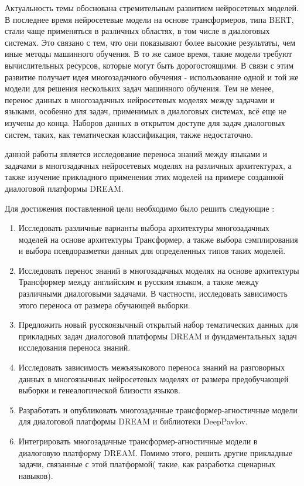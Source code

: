 
{\actuality} 
Актуальность темы обоснована стремительным развитием нейросетевых моделей. В последнее время нейросетевые модели на основе трансформеров, типа BERT, стали чаще применяться в различных областях, в том числе в диалоговых системах. Это связано с тем, что они показывают более высокие результаты, чем иные методы машинного обучения. В то же самое время, такие модели требуют вычислительных ресурсов, которые могут быть дорогостоящими. В связи с этим развитие получает идея многозадачного обучения - использование одной и той же модели для решения нескольких задач машинного обучения. Тем не менее, перенос данных в многозадачных нейросетевых моделях между задачами и языками, особенно для задач, применимых в диалоговых системах, всё еще не изучены до конца. Наборов данных в открытом доступе для задач диалоговых систем, таких, как тематическая классификация, также недостаточно.


{\aim} данной работы является исследование переноса знаний между языками и задачами в многозадачных нейросетевых моделях на различных архитектурах, а также изучение прикладного применения этих моделей на примере созданной диалоговой платформы DREAM.

Для достижения поставленной цели необходимо было решить следующие {\tasks}:
\begin{enumerate}
  \item Исследовать различные варианты выбора архитектуры многозадачных моделей на основе архитектуры Трансформер, а также выбора сэмплирования и выбора псевдоразметки данных для определенных типов таких моделей.
  \item Исследовать перенос знаний в многозадачных моделях на основе архитектуры Трансформер между английским и русским языком, а также между различными диалоговыми задачами. В частности, исследовать зависимость этого переноса от размера обучающей выборки.
  \item Предложить новый русскоязычный открытый набор тематических данных для прикладных задач диалоговой платформы DREAM и фундаментальных задач исследования переноса знаний.
  \item Исследовать зависимость межъязыкового переноса знаний на разговорных данных в многоязычных нейросетевых моделях от размера предобучающей выборки и генеалогической близости языков.
  \item Разработать и опубликовать многозадачные трансформер-агностичные модели для диалоговой платформы DREAM и библиотеки DeepPavlov.
  \item Интегрировать многозадачные трансформер-агностичные модели в диалоговую платформу DREAM. Помимо этого, решить другие прикладные задачи, связанные с этой платформой( такие, как разработка сценарных навыков).
  \newline
  \newline
\end{enumerate}


